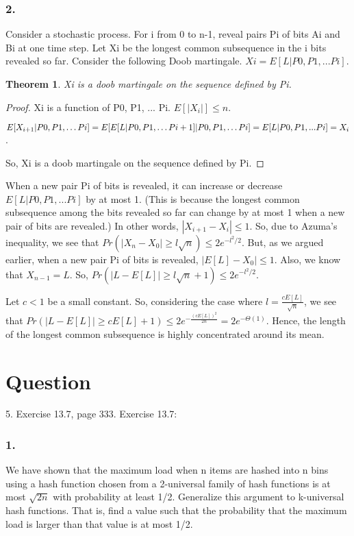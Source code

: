 \documentclass[10pt]{amsart}
\newtheorem{thm}{Theorem}[subsection]
\theoremstyle{remark}
\begin{document}
\subsubsection{2.}
Consider a stochastic process. For i from 0 to n-1, reveal pairs Pi of bits Ai and Bi at one time step. Let Xi be the longest common subsequence in the i bits revealed so far. Consider the following Doob martingale. $Xi = E[L|P0, P1, ... Pi]$.

\begin{thm}
Xi is a doob martingale on the sequence defined by Pi.
\end{thm}
\begin{proof}
Xi is a function of P0, P1, ... Pi. $E[|X_{i}|] \leq n$.

$E[X_{i+1}|P0, P1, \dots Pi] = E[E[L|P0, P1, \dots Pi+1]| P0, P1, \dots Pi] \\
= E[L|P0, P1, ... Pi] = X_{i}$.

So, Xi is a doob martingale on the sequence defined by Pi.
\end{proof}

When a new pair Pi of bits is revealed, it can increase or decrease \\
$E[L|P0, P1, ... Pi]$ by at most 1. (This is because the longest common subsequence among the bits revealed so far can change by at most 1 when a new pair of bits are revealed.) In other words, $|X_{i+1} - X_{i}| \leq 1$. So, due to Azuma's inequality, we see that $Pr(|X_{n} - X_{0}| \geq l\sqrt{n}) \leq 2e^{-l^{2}/2}$. But, as we argued earlier, when a new pair Pi of bits is revealed, $|E[L]-X_{0}| \leq 1$. Also, we know that $X_{n-1} = L$. So, $Pr(|L - E[L]| \geq l\sqrt{n} + 1) \leq 2e^{-l^{2}/2}$.

Let $c<1$ be a small constant. So, considering the case where $l=\frac{cE[L]}{\sqrt{n}}$, we see that $Pr(|L - E[L]| \geq cE[L] + 1) \leq 2e^{-\frac{(cE[L])^{2}}{2n}} = 2e^{-\Theta(1)}$. Hence, the length of the longest common subsequence is highly concentrated around its mean.

\section{Question}
5. Exercise 13.7, page 333. Exercise 13.7:

\subsubsection{1.} We have shown that the maximum load when n items are hashed into n bins using a hash function chosen from a 2-universal family of hash functions is at most $\sqrt{2n}$ with probability at least 1/2. Generalize this argument to k-universal hash functions. That is, find a value such that the probability that the maximum load is larger than that value is at most 1/2.
\end{document}
